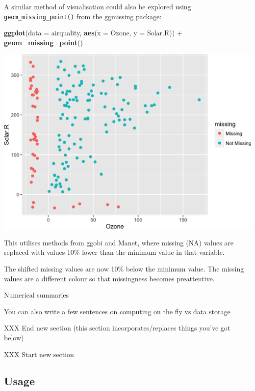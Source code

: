 \documentclass[]{article}
\newenvironment{Shaded}{\begin{snugshade}}{\end{snugshade}}
\newcommand{\KeywordTok}[1]{\textcolor[rgb]{0.13,0.29,0.53}{\textbf{{#1}}}}
\newcommand{\DataTypeTok}[1]{\textcolor[rgb]{0.13,0.29,0.53}{{#1}}}
\newcommand{\StringTok}[1]{\textcolor[rgb]{0.31,0.60,0.02}{{#1}}}
\newcommand{\NormalTok}[1]{{#1}}
\begin{document}
A similar method of visualisation could also be explored using
\texttt{geom\_missing\_point()} from the ggmissing package:

\begin{Shaded}
\begin{Highlighting}[]
\KeywordTok{ggplot}\NormalTok{(}\DataTypeTok{data =} \NormalTok{airquality,}
       \KeywordTok{aes}\NormalTok{(}\DataTypeTok{x =} \NormalTok{Ozone,}
           \DataTypeTok{y =} \NormalTok{Solar.R)) +}\StringTok{ }
\StringTok{  }\KeywordTok{geom_missing_point}\NormalTok{()}
\end{Highlighting}
\end{Shaded}

\includegraphics{jsm2017_files/figure-latex/unnamed-chunk-3-1.png}

This utilises methods from ggobi and Manet, where missing (NA) values
are replaced with values 10\% lower than the minimum value in that
variable.

The shifted missing values are now 10\% below the minimum value. The
missing values are a different colour so that missingness becomes
preattentive.

Numerical summaries

You can also write a few sentences on computing on the fly vs data
storage

XXX End new section (this section incorporates/replaces things you've
got below)

XXX Start new section

\subsection{Usage}\label{usage}
\end{document}
